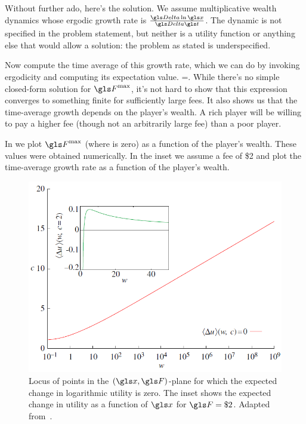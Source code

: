 Without further ado, here's the solution. We assume multiplicative wealth dynamics
whose ergodic growth rate is $\frac{\D \ln \x}{\D \t}$. The dynamic is not specified
in the problem statement, but neither is a utility function or anything else that would allow
a solution: the problem as stated is underspecified.

Now compute the time average of this growth rate, which we can do by invoking ergodicity
and computing its expectation value.
\be
\frac{\ave{\D \ln \x}}{\D \t}=\frac{\ave{\ln(\x+\q-\F)}-\ln(\x)}{\D\t}.
\ee
While there's no simple closed-form solution for $\F^{\text{max}}$, it's not hard to 
show that this expression converges to something finite for sufficiently large fees. 
It also shows us that the time-average growth depends on the player's wealth.
A rich player will be willing to pay a higher fee (though not an arbitrarily 
large fee) than a poor player.

In  we plot $\F^{\text{max}}$ (where  is zero) as a 
function of the player's wealth. These values were obtained numerically.
In the inset we assume a fee of \$2 and plot the time-average growth 
rate  as a function of the player's wealth. 
\begin{figure}
\centering
\includegraphics[width=\textwidth]{./chapter_riskless/figs/gbar_zero.png}
\caption{Locus of points in the $(\x,\F)$-plane for which the expected change in 
logarithmic utility is zero. The inset shows the expected change in utility as a 
function of $\x$ for $\F=\$2$. Adapted from~\cite{Peters2011b}.}
\end{figure}

